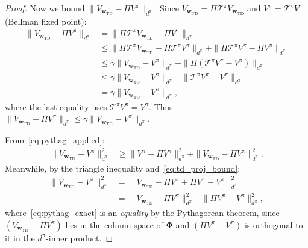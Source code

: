 \documentclass[11pt,a4paper]{article}
\theoremstyle{definition}
\theoremstyle{plain}
\theoremstyle{remark}
\begin{document}
\begin{proof}
Now we bound $\|V_{\bm{w}_{\text{TD}}} - \Pi V^\pi\|_{d^\pi}$. Since $V_{\bm{w}_{\text{TD}}} = \Pi\mathcal{T}^\pi V_{\bm{w}_{\text{TD}}}$ and $V^\pi = \mathcal{T}^\pi V^\pi$ (Bellman fixed point):
\begin{align}
    \|V_{\bm{w}_{\text{TD}}} - \Pi V^\pi\|_{d^\pi}
    &= \|\Pi\mathcal{T}^\pi V_{\bm{w}_{\text{TD}}} - \Pi V^\pi\|_{d^\pi} \nonumber\\
    &\leq \|\Pi\mathcal{T}^\pi V_{\bm{w}_{\text{TD}}} - \Pi\mathcal{T}^\pi V^\pi\|_{d^\pi} + \|\Pi\mathcal{T}^\pi V^\pi - \Pi V^\pi\|_{d^\pi} \nonumber\\
    &\leq \gamma\|V_{\bm{w}_{\text{TD}}} - V^\pi\|_{d^\pi} + \|\Pi(\mathcal{T}^\pi V^\pi - V^\pi)\|_{d^\pi} \nonumber\\
    &\leq \gamma\|V_{\bm{w}_{\text{TD}}} - V^\pi\|_{d^\pi} + \|\mathcal{T}^\pi V^\pi - V^\pi\|_{d^\pi} \nonumber\\
    &= \gamma\|V_{\bm{w}_{\text{TD}}} - V^\pi\|_{d^\pi}, \label{eq:td_proj_bound}
\end{align}
where the last equality uses $\mathcal{T}^\pi V^\pi = V^\pi$. Thus $\|V_{\bm{w}_{\text{TD}}} - \Pi V^\pi\|_{d^\pi} \leq \gamma\|V_{\bm{w}_{\text{TD}}} - V^\pi\|_{d^\pi}$.

From~\eqref{eq:pythag_applied}:
\begin{align}
    \|V_{\bm{w}_{\text{TD}}} - V^\pi\|_{d^\pi}^2
    &\geq \|V^\pi - \Pi V^\pi\|_{d^\pi}^2 + \|V_{\bm{w}_{\text{TD}}} - \Pi V^\pi\|_{d^\pi}^2. \label{eq:pythag_rearrange}
\end{align}
Meanwhile, by the triangle inequality and~\eqref{eq:td_proj_bound}:
\begin{align}
    \|V_{\bm{w}_{\text{TD}}} - V^\pi\|_{d^\pi}^2
    &= \|V_{\bm{w}_{\text{TD}}} - \Pi V^\pi + \Pi V^\pi - V^\pi\|_{d^\pi}^2 \nonumber\\
    &= \|V_{\bm{w}_{\text{TD}}} - \Pi V^\pi\|_{d^\pi}^2 + \|\Pi V^\pi - V^\pi\|_{d^\pi}^2, \label{eq:pythag_exact}
\end{align}
where~\eqref{eq:pythag_exact} is an \emph{equality} by the Pythagorean theorem, since $(V_{\bm{w}_{\text{TD}}} - \Pi V^\pi)$ lies in the column space of $\bm{\Phi}$ and $(\Pi V^\pi - V^\pi)$ is orthogonal to it in the $d^\pi$-inner product.


\end{proof}
\end{document}
